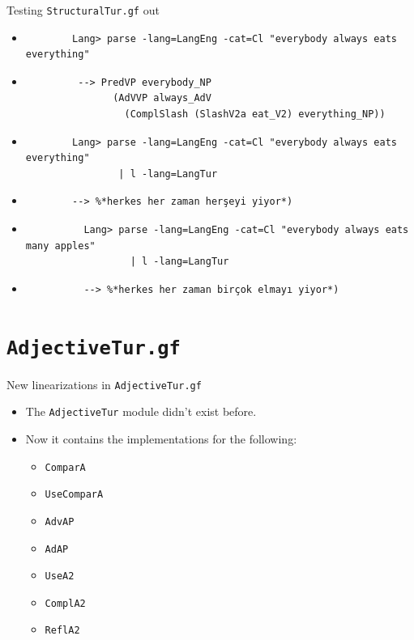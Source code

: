 \documentclass{beamer}
\begin{document}
  \begin{frame}[fragile]{Testing \texttt{StructuralTur.gf} out}
    \begin{itemize}
      \item<1->
        \begin{lstlisting}
        Lang> parse -lang=LangEng -cat=Cl "everybody always eats everything"
        \end{lstlisting}
      \item<2->
        \begin{lstlisting}
         --> PredVP everybody_NP
               (AdVVP always_AdV
                 (ComplSlash (SlashV2a eat_V2) everything_NP))
        \end{lstlisting}
      \item<3->
        \begin{lstlisting}
        Lang> parse -lang=LangEng -cat=Cl "everybody always eats everything"
                | l -lang=LangTur
        \end{lstlisting}
      \item<4->
        \begin{lstlisting}
        --> %*herkes her zaman herşeyi yiyor*)
        \end{lstlisting}
      \item<5->
        \begin{lstlisting}
          Lang> parse -lang=LangEng -cat=Cl "everybody always eats many apples"
                  | l -lang=LangTur
        \end{lstlisting}
      \item<6->
        \begin{lstlisting}
          --> %*herkes her zaman birçok elmayı yiyor*)
        \end{lstlisting}
    \end{itemize}
  \end{frame}

  \section{\texttt{AdjectiveTur.gf}}

  \begin{frame}{New linearizations in \texttt{AdjectiveTur.gf}}
    \begin{itemize}
      \item<1-> The \texttt{AdjectiveTur} module didn't exist before.
      \item<2-> Now it contains the implementations for the following:
        \begin{itemize}
          \item \texttt{ComparA}
          \item \texttt{UseComparA}
          \item \texttt{AdvAP}
          \item \texttt{AdAP}
          \item \texttt{UseA2}
          \item \texttt{ComplA2}
          \item \texttt{ReflA2}
        \end{itemize}
    \end{itemize}
  \end{frame}
\end{document}
